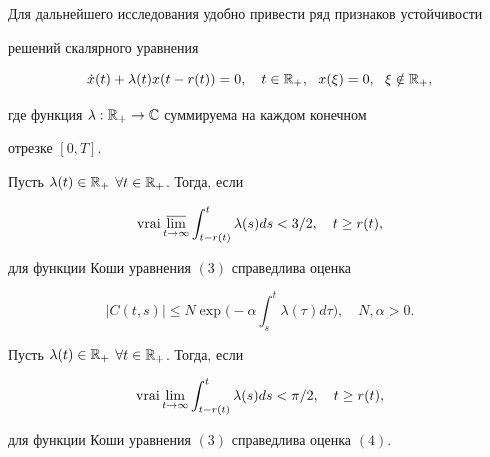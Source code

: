  


Для дальнейшего исследования удобно привести ряд признаков устойчивости 


решений скалярного уравнения


\begin{equation} 


\Dot x(t)+\lambda(t)x(t-r(t))=0,\quad t\in\Bbb R_+, 


\ \ x(\xi)=0,\ \ \xi\notin\Bbb R_+, 


\end{equation} 


где функция $\lambda:\Bbb R_+\to\Bbb C$ суммируема на каждом конечном 


отрезке $[0,T]$. 


 


\begin{lem}


Пусть $\lambda(t)\in\Bbb R_+$ $\forall t\in\Bbb R_+$. Тогда, если 


$$ 


\vrai\underset{t\to\infty}{\varlimsup}\int^t_{t-r(t)} 


\lambda(s)d s< 3/2,\quad t\ge r(t), 


$$ 


для функции Коши уравнения $(3)$ справедлива оценка 


\begin{equation} 


|C(t,s)|\le N\exp\bigg(-\alpha\int^t_s \lambda(\tau)d\tau \bigg), 


\quad N,\alpha>0. 


\end{equation} 


\end{lem} 


 


\begin{lem}


Пусть $\lambda(t)\in\Bbb R_+$ $\forall t\in\Bbb R_+$. Тогда, если 


$$ 


\vrai\lim_{t\to\infty}\int^t_{t-r(t)}\lambda(s)d s<\pi/2, 


\quad t\ge r(t), 


$$ 


для функции Коши уравнения $(3)$ справедлива оценка $(4)$. 


\end{lem} 


